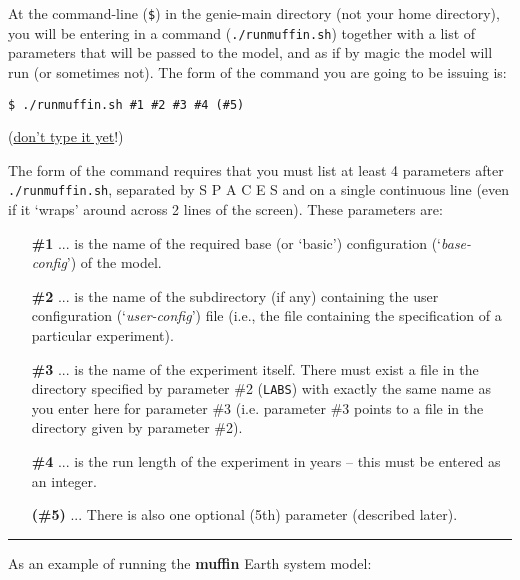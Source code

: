\documentclass[11pt,fleqn]{book} %
\begin{document}
At the command-line (\texttt{\$}) in the \textsf{\footnotesize genie-main} directory (not your home directory), you will be entering in a command (\texttt{./runmuffin.sh}) together with a list of parameters that will be passed to the model, and as if by magic the model will run (or sometimes not). The form of the command you are going to be issuing is:

\vspace{-1mm}
\begin{verbatim}
$ ./runmuffin.sh #1 #2 #3 #4 (#5)
\end{verbatim}
\vspace{-1mm}

\noindent(\uline{don't type it yet}!)

\vspace{1mm}
The form of the command requires that you must list at least 4 parameters after \texttt{./runmuffin.sh}, separated by S P A C E S and on a single continuous line (even if it ‘wraps’ around across 2 lines of the screen).
These parameters are:

\vspace{2mm}
\begin{enumerate}[noitemsep]
\setlength{\itemindent}{.2in}
\item[\textbf{\#1}] ... is the name of the required base (or ‘basic’) configuration (‘\textit{base-config}’) of the model.
\item[\textbf{\#2}] ... is the name of the subdirectory (if any) containing the user configuration (‘\textit{user-config}’) file (i.e., the file containing the specification of a particular experiment).
\item[\textbf{\#3}] ... is the name of the experiment itself. There must exist a file in the directory specified by parameter \#2 (\texttt{LABS}) with exactly the same name as you enter here for parameter \#3 (i.e. parameter \#3 points to a file in the directory given by parameter \#2).
\item[\textbf{\#4}] ... is the run length of the experiment in years – this must be entered as an integer.
\item[\textbf{(\#5)}] ... There is also one optional (5th) parameter (described later).
\end{enumerate}



\vspace{1mm}
\noindent\rule{4cm}{0.1mm}
\vspace{2mm}

\noindent As an example of running the \textbf{muffin} Earth system model:
\end{document}
